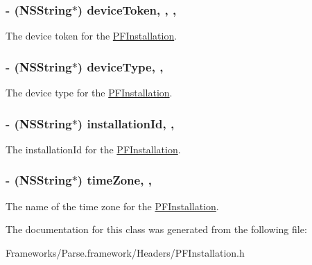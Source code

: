 \subsubsection[{device\+Token}]{\setlength{\rightskip}{0pt plus 5cm}-\/ (N\+S\+String$\ast$) device\+Token\hspace{0.3cm}{\ttfamily [read]}, {\ttfamily [write]}, {\ttfamily [nonatomic]}, {\ttfamily [copy]}}\label{interface_p_f_installation_a5ea812bfe9db860563f3b672dc657ce7}
The device token for the {\ttfamily \hyperlink{interface_p_f_installation}{P\+F\+Installation}}. \hypertarget{interface_p_f_installation_afac8d2521c0fd031e204c5642ce271a6}{}
\subsubsection[{device\+Type}]{\setlength{\rightskip}{0pt plus 5cm}-\/ (N\+S\+String$\ast$) device\+Type\hspace{0.3cm}{\ttfamily [read]}, {\ttfamily [nonatomic]}, {\ttfamily [copy]}}\label{interface_p_f_installation_afac8d2521c0fd031e204c5642ce271a6}




 





The device type for the {\ttfamily \hyperlink{interface_p_f_installation}{P\+F\+Installation}}. \hypertarget{interface_p_f_installation_aba5ea4cb6705ac365a6a33fcf775deb8}{}
\subsubsection[{installation\+Id}]{\setlength{\rightskip}{0pt plus 5cm}-\/ (N\+S\+String$\ast$) installation\+Id\hspace{0.3cm}{\ttfamily [read]}, {\ttfamily [nonatomic]}, {\ttfamily [copy]}}\label{interface_p_f_installation_aba5ea4cb6705ac365a6a33fcf775deb8}
The installation\+Id for the {\ttfamily \hyperlink{interface_p_f_installation}{P\+F\+Installation}}. \hypertarget{interface_p_f_installation_adb6faa1119a0a6155940bf6837037bff}{}
\subsubsection[{time\+Zone}]{\setlength{\rightskip}{0pt plus 5cm}-\/ (N\+S\+String$\ast$) time\+Zone\hspace{0.3cm}{\ttfamily [read]}, {\ttfamily [nonatomic]}, {\ttfamily [copy]}}\label{interface_p_f_installation_adb6faa1119a0a6155940bf6837037bff}
The name of the time zone for the {\ttfamily \hyperlink{interface_p_f_installation}{P\+F\+Installation}}. 

The documentation for this class was generated from the following file\+:\begin{DoxyCompactItemize}
\item 
Frameworks/\+Parse.\+framework/\+Headers/P\+F\+Installation.\+h\end{DoxyCompactItemize}
